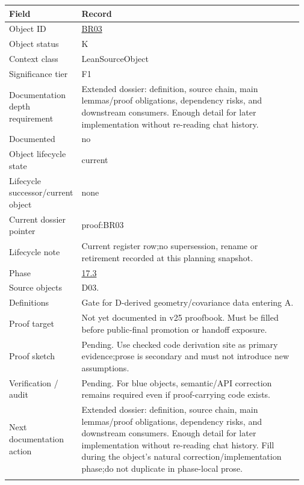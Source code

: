 \begin{longtable}{L{0.16\linewidth} L{0.81\linewidth}}
\hline
\textbf{Field} & \textbf{Record}\\
\hline
Object ID & \hyperlink{object-row-BR03}{BR03}\\
\hline\addlinespace[0.20em]
Object status & K\\
\hline\addlinespace[0.20em]
Context class & LeanSourceObject\\
\hline\addlinespace[0.20em]
Significance tier & F1\\
\hline\addlinespace[0.20em]
Documentation depth requirement & Extended dossier: definition, source chain, main lemmas/\allowbreak{}proof obligations, dependency risks, and downstream consumers. Enough detail for later implementation without re-reading chat history.\\
\hline\addlinespace[0.20em]
Documented & no\\
\hline\addlinespace[0.20em]
Object lifecycle state & current\\
\hline\addlinespace[0.20em]
Lifecycle successor/\allowbreak{}current object & none\\
\hline\addlinespace[0.20em]
Current dossier pointer & proof:BR03\\
\hline\addlinespace[0.20em]
Lifecycle note & Current register row;\newline no supersession, rename or retirement recorded at this planning snapshot.\\
\hline\addlinespace[0.20em]
Phase & \hyperlink{phase-row-17-3}{17.3}\\
\hline\addlinespace[0.20em]
Source objects & D03.\\
\hline\addlinespace[0.20em]
Definitions & Gate for D-derived geometry/\allowbreak{}covariance data entering A.\\
\hline\addlinespace[0.20em]
Proof target & Not yet documented in v25 proofbook. Must be filled before public-final promotion or handoff exposure.\\
\hline\addlinespace[0.20em]
Proof sketch & Pending. Use checked code derivation site as primary evidence;\newline prose is secondary and must not introduce new assumptions.\\
\hline\addlinespace[0.20em]
Verification /\allowbreak{} audit & Pending. For blue objects, semantic/\allowbreak{}API correction remains required even if proof-carrying code exists.\\
\hline\addlinespace[0.20em]
Next documentation action & Extended dossier: definition, source chain, main lemmas/\allowbreak{}proof obligations, dependency risks, and downstream consumers. Enough detail for later implementation without re-reading chat history. Fill during the object's natural correction/\allowbreak{}implementation phase;\newline do not duplicate in phase-local prose.\\
\hline\addlinespace[0.20em]
\end{longtable}
